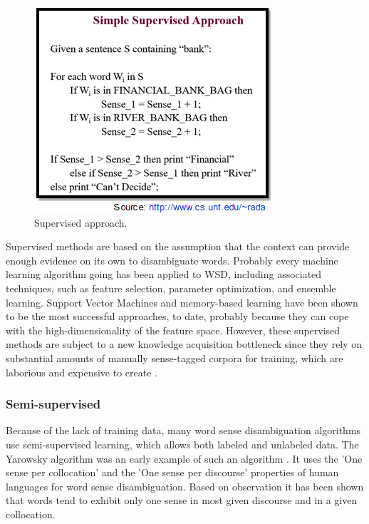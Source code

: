 \begin{figure}[tbh]
	\begin{center}
		\includegraphics[width=\columnwidth]{Union_Background_Chart_sup3}
	\end{center}
	\caption{Supervised approach.}
\end{figure}

Supervised methods are based on the assumption that the context can provide enough evidence on its own to disambiguate words. 
Probably every machine learning algorithm going has been applied to WSD, including associated techniques, such as feature selection, parameter optimization, and ensemble learning.
 Support Vector Machines and memory-based learning have been shown to be the most successful approaches, to date, probably because they can cope with the high-dimensionality of the feature space. 
However, these supervised methods are subject to a new knowledge acquisition bottleneck since they rely on substantial amounts of manually sense-tagged corpora for training, which are laborious and expensive to create \cite{aramossoto2016onthe}.

\subsubsection*{Semi-supervised}

Because of the lack of training data, many word sense disambiguation algorithms use semi-supervised learning, which allows both labeled and unlabeled data. 
The Yarowsky algorithm was an early example of such an algorithm \cite{Gartner201317}. 
It uses the 'One sense per collocation' and the 'One sense per discourse' properties of human languages for word sense disambiguation. 
Based on observation it has been shown that words tend to exhibit only one sense in most given discourse and in a given collocation. 

